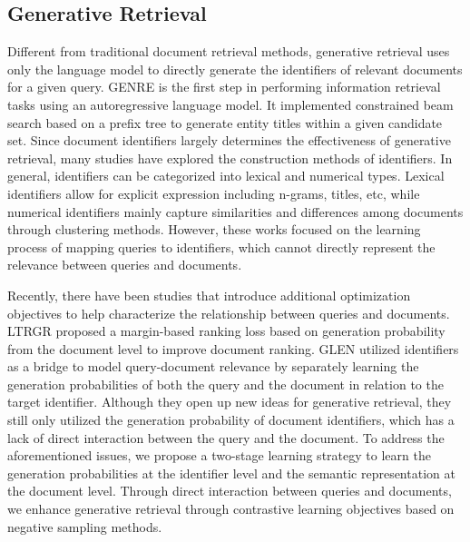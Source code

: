 \subsection{Generative Retrieval}
Different from traditional document retrieval methods, generative retrieval uses only the language model to directly generate the identifiers of relevant documents for a given query. GENRE \cite{GENRE} is the first step in performing information retrieval tasks using an autoregressive language model. It implemented constrained beam search based on a prefix tree to generate entity titles within a given candidate set. 
Since document identifiers largely determines the effectiveness of generative retrieval, many studies have explored the construction methods of identifiers. 
In general, identifiers can be categorized into lexical and numerical types. Lexical identifiers allow for explicit expression including n-grams\cite{SEAL,NOVO}, titles\cite{GENRE,MINDER}, etc, while numerical identifiers\cite{DSI,NCI,Genret} mainly capture similarities and differences among documents through clustering methods. 
However, these works focused on the learning process of mapping queries to identifiers, which cannot directly represent the relevance between queries and documents.

Recently, there have been studies that introduce additional optimization objectives to help characterize the relationship between queries and documents.
LTRGR \cite{LTRGR} proposed a margin-based ranking loss based on generation probability from the document level to improve document ranking.
GLEN \cite{GLEN} utilized identifiers as a bridge to model query-document relevance by separately learning the generation probabilities of both the query and the document in relation to the target identifier.
Although they open up new ideas for generative retrieval, they still only utilized the generation probability of document identifiers, which has a lack of direct interaction between the query and the document.
To address the aforementioned issues, we propose a two-stage learning strategy to learn the generation probabilities at the identifier level and the semantic representation at the document level.  
Through direct interaction between queries and documents, we enhance generative retrieval through contrastive learning objectives based on negative sampling methods.